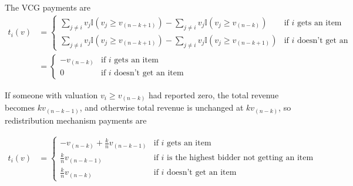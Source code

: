 \documentclass[10pt]{article}
\begin{document}
\begin{spacing}{1.0}
\begin{enumerate}
  The VCG payments are
  \begin{align*}
    t_i(v) &=
      \begin{cases}
        \sum_{j \ne i} v_j \mathbb{I}(v_j \ge v_{(n-k+1)}) - \sum_{j \ne i}
        v_j \mathbb{I}(v_j \ge v_{(n-k)}) & \mbox{if $i$ gets an item} \\
        \sum_{j \ne i} v_j \mathbb{I}(v_j \ge v_{(n-k+1)}) - \sum_{j \ne i}
        v_j \mathbb{I}(v_j \ge v_{(n-k+1)}) & \mbox{if $i$ doesn't get
          an item}
      \end{cases} \\
      & =
      \begin{cases}
        -v_{(n-k)} & \mbox{if $i$ gets an item} \\
        0 & \mbox{if $i$ doesn't get an item}
      \end{cases}
  \end{align*}

  If someone with valuation $v_i \ge v_{(n-k)}$ had reported zero, the
  total revenue becomes $k v_{(n-k-1)}$, and otherwise total revenue is
  unchanged at $k v_{(n-k)}$, so redistribution mechanism payments are

  \begin{align*}
    t_i(v) &=
      \begin{cases}
        - v_{(n-k)} + \frac{k}{n} v_{(n-k-1)} & \mbox{if $i$ gets an item} \\
        \frac{k}{n} v_{(n-k-1)} & \mbox{if $i$ is the highest bidder not
          getting an item} \\
        \frac{k}{n} v_{(n-k)} & \mbox{if $i$ doesn't get an item}
      \end{cases}
  \end{align*}

\end{enumerate}

\end{spacing}
\end{document}
